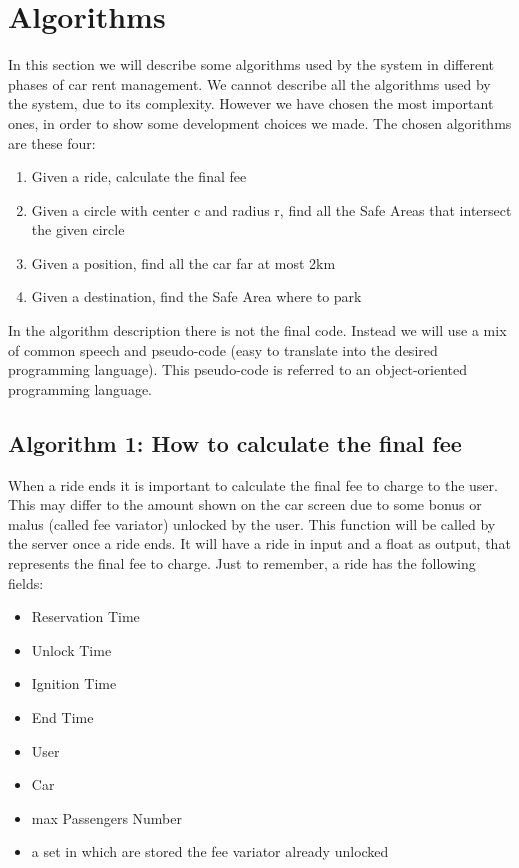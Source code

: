 \section{Algorithms}
In this section we will describe some algorithms used by the system in different phases of car rent management. We cannot describe all the algorithms used by the system, due to its complexity. However we have chosen the most important ones, in order to show some development choices we made.
The chosen algorithms are these four:
\begin{enumerate}
\item Given a ride, calculate the final fee
\item Given a circle with center c and radius r, find all the Safe Areas that intersect the given circle
\item Given a position, find all the car far at most 2km
\item Given a destination, find the Safe Area where to park
\end{enumerate}
In the algorithm description there is not the final code. Instead we will use a mix of common speech and pseudo-code (easy to translate into the desired programming language). This pseudo-code is referred to an object-oriented programming language.

\subsection{Algorithm 1: How to calculate the final fee}
When a ride ends it is important to calculate the final fee to charge to the user. This may differ to the amount shown on the car screen due to some bonus or malus (called fee variator) unlocked by the user.
This function will be called by the server once a ride ends. It will have a ride in input and a float as output, that represents the final fee to charge.
Just to remember, a ride has the following fields:
\begin{itemize}
\item Reservation Time
\item Unlock Time
\item Ignition Time
\item End Time
\item User
\item Car
\item max Passengers Number
\item a set in which are stored the fee variator already unlocked
\end{itemize}

